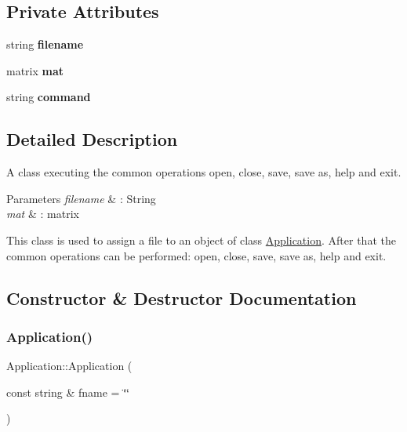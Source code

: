 \subsection*{Private Attributes}
\begin{DoxyCompactItemize}
\item 
\mbox{\label{class_application_a3a20c3178562a91be951369d3356aabd}} 
string {\bfseries filename}
\item 
\mbox{\label{class_application_ae126cc1a7d1f29ad485ddd285dadf3a3}} 
matrix {\bfseries mat}
\item 
\mbox{\label{class_application_acffe56e592fb525ce14ad0437c2c3d34}} 
string {\bfseries command}
\end{DoxyCompactItemize}


\subsection{Detailed Description}
A class executing the common operations open, close, save, save as, help and exit. 


\begin{DoxyParams}{Parameters}
{\em filename} & \+: String \\
\hline
{\em mat} & \+: matrix\\
\hline
\end{DoxyParams}
This class is used to assign a file to an object of class \hyperlink{class_application}{Application}. After that the common operations can be performed\+: open, close, save, save as, help and exit. 

\subsection{Constructor \& Destructor Documentation}
\mbox{\label{class_application_ade4650e7378dae1d94794b86995fd571}} 
\subsubsection{\texorpdfstring{Application()}{Application()}}
{\footnotesize\ttfamily Application\+::\+Application (\begin{DoxyParamCaption}\item[{const string \&}]{fname = {\ttfamily \char`\"{}\char`\"{}} }\end{DoxyParamCaption})\hspace{0.3cm}{\ttfamily [explicit]}}

